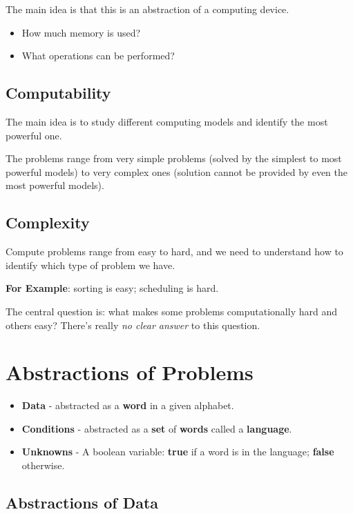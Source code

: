 \documentclass{article}
\begin{document}
The main idea is that this is an abstraction of a computing device.

\begin{itemize}
\item How much memory is used?
\item What operations can be performed?
\end{itemize}

\subsection*{Computability}

The main idea is to study different computing models and identify the
most powerful one.

The problems range from very simple problems (solved by the simplest
to most powerful models) to very complex ones (solution cannot be
provided by even the most powerful models).

\subsection*{Complexity}

Compute problems range from easy to hard, and we need to understand
how to identify which type of problem we have.

\textbf{For Example}: sorting is easy; scheduling is hard.

The central question is: what makes some problems computationally hard
and others easy? There's really \textit{no clear answer} to this
question.

\section*{Abstractions of Problems}

\begin{itemize}
\item \textbf{Data} - abstracted as a \textbf{word} in a given
  alphabet.

\item \textbf{Conditions} - abstracted as a \textbf{set} of
  \textbf{words} called a \textbf{language}.

\item \textbf{Unknowns} - A boolean variable: \textbf{true} if a word
  is in the language; \textbf{false} otherwise.
\end{itemize}

\subsection*{Abstractions of Data}
\end{document}
